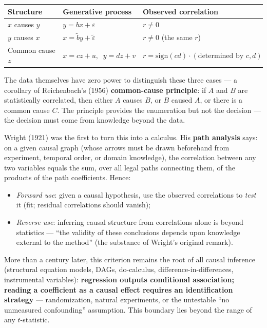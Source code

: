 \begin{center}
\begin{tabular}{@{}lll@{}}
\toprule
Structure & Generative process & Observed correlation \\
\midrule
$x$ causes $y$ & $y = bx + \varepsilon$ & $r \neq 0$ \\
$y$ causes $x$ & $x = \tilde{b} y + \tilde\varepsilon$ & $r \neq 0$ (the same $r$) \\
Common cause $z$ & $x = c z + u,\;\; y = d z + v$ & $r = \mathrm{sign}(cd)\cdot(\text{determined by } c,d)$ \\
\bottomrule
\end{tabular}
\end{center}

The data themselves have zero power to distinguish these three cases --- a corollary of Reichenbach's (1956) \textbf{common-cause principle}: if $A$ and $B$ are statistically correlated, then either $A$ causes $B$, or $B$ caused $A$, or there is a common cause $C$\cite{reichenbach1956}. The principle provides the enumeration but not the decision --- the decision must come from knowledge beyond the data.

Wright (1921) was the first to turn this into a calculus\cite{wright1921}. His \textbf{path analysis} says: on a given causal graph (whose arrows must be drawn beforehand from experiment, temporal order, or domain knowledge), the correlation between any two variables equals the sum, over all legal paths connecting them, of the products of the path coefficients. Hence:
\begin{itemize}
  \item \textit{Forward use}: given a causal hypothesis, use the observed correlations to \textit{test} it (fit; residual correlations should vanish);
  \item \textit{Reverse use}: inferring causal structure from correlations alone is beyond statistics --- ``the validity of these conclusions depends upon knowledge external to the method'' (the substance of Wright's original remark\cite{wright1921}).
\end{itemize}

More than a century later, this criterion remains the root of all causal inference (structural equation models, DAGs, do-calculus, difference-in-differences, instrumental variables): \textbf{regression outputs conditional association; reading a coefficient as a causal effect requires an identification strategy} --- randomization, natural experiments, or the untestable ``no unmeasured confounding'' assumption. This boundary lies beyond the range of any $t$-statistic.

